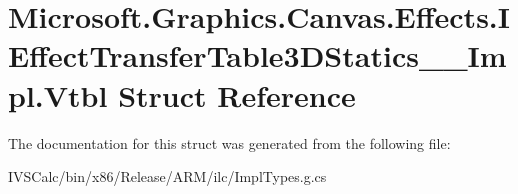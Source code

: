 \hypertarget{struct_microsoft_1_1_graphics_1_1_canvas_1_1_effects_1_1_i_effect_transfer_table3_d_statics_____impl_1_1_vtbl}{}\section{Microsoft.\+Graphics.\+Canvas.\+Effects.\+I\+Effect\+Transfer\+Table3\+D\+Statics\+\_\+\+\_\+\+Impl.\+Vtbl Struct Reference}
\label{struct_microsoft_1_1_graphics_1_1_canvas_1_1_effects_1_1_i_effect_transfer_table3_d_statics_____impl_1_1_vtbl}


The documentation for this struct was generated from the following file\+:\begin{DoxyCompactItemize}
\item 
I\+V\+S\+Calc/bin/x86/\+Release/\+A\+R\+M/ilc/Impl\+Types.\+g.\+cs\end{DoxyCompactItemize}
